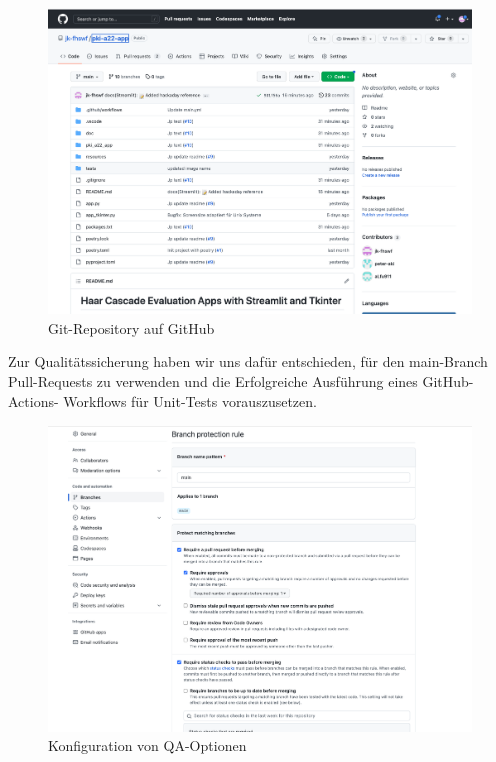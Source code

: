 \documentclass{article}
\begin{document}
\begin{figure}[H]
	\begin{center}
 	\includegraphics[scale=0.25]{../images/ci_git.png}
 	\caption{Git-Repository auf GitHub}
	\end{center}
\end{figure}

Zur Qualitätssicherung haben wir uns dafür entschieden, für den main-Branch
Pull-Requests zu verwenden und die Erfolgreiche Ausführung eines GitHub-Actions-
Workflows für Unit-Tests vorauszusetzen.

\begin{figure}[H]
	\begin{center}
 	\includegraphics[scale=0.25]{../images/ci_protection.png}
 	\caption{Konfiguration von QA-Optionen}
	\end{center}
\end{figure}
\end{document}
